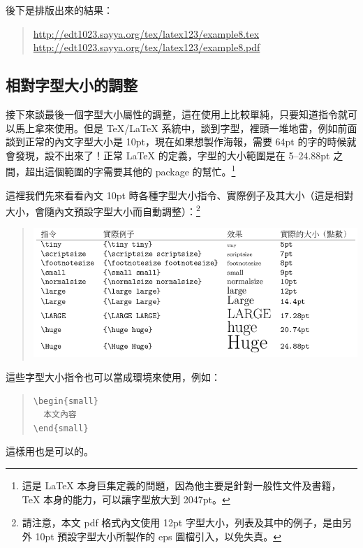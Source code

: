 後下是排版出來的結果：

\begin{quote}
   \url{http://edt1023.sayya.org/tex/latex123/example8.tex} \\
   \url{http://edt1023.sayya.org/tex/latex123/example8.pdf}
\end{quote}

\subsection{相對字型大小的調整}

接下來談最後一個字型大小屬性的調整，這在使用上比較單純，只要知道指令就可以馬上拿來使用。但是 \TeX{}/\LaTeX{} 系統中，談到字型，裡頭一堆地雷，例如前面談到正常的內文字型大小是 10pt，現在如果想製作海報，需要 64pt 的字的時候就會發現，設不出來了！正常 \LaTeX{} 的定義，字型的大小範圍是在 5--24.88pt 之間，超出這個範圍的字需要其他的 package 的幫忙。\footnote{這是 \LaTeX{} 本身巨集定義的問題，因為他主要是針對一般性文件及書籍，\TeX{} 本身的能力，可以讓字型放大到 2047pt。}

這裡我們先來看看內文 10pt 時各種字型大小指令、實際例子及其大小（這是相對大小，會隨內文預設字型大小而自動調整）：\footnote{請注意，本文 pdf 格式內文使用 12pt 字型大小，列表及其中的例子，是由另外 10pt 預設字型大小所製作的 eps 圖檔引入，以免失真。}

\begin{quote}
   \centering
   \includegraphics{fntsize}
\end{quote}

這些字型大小指令也可以當成環境來使用，例如：

\begin{quote}
   \begin{verbatim}
\begin{small}
  本文內容
\end{small}
\end{verbatim}
\end{quote}

這樣用也是可以的。


